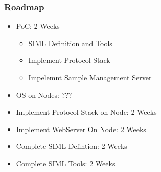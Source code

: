 \documentclass{beamer}
\begin{document}
\begin{frame}
	\frametitle{Roadmap}
	\begin{itemize}
		\item PoC: 2 Weeks
		\begin{itemize}
			\item SIML Definition and Tools
			\item Implement Protocol Stack
			\item Impelemnt Sample Management Server
		\end{itemize}
		\item OS on Nodes: ???
		\item Implement Protocol Stack on Node: 2 Weeks
		\item Implement WebServer On Node: 2 Weeks
		\item Complete SIML Defintion: 2 Weeks
		\item Complete SIML Tools: 2 Weeks
	\end{itemize}
\end{frame}
\end{document}
